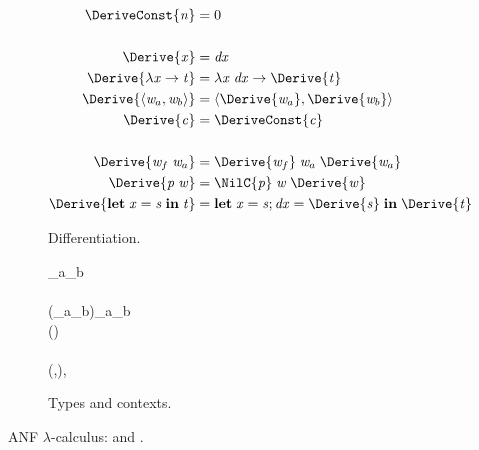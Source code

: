 \begin{figure}[h]
\begin{subfigure}[t]{0.5\textwidth}
\begin{align*}
  \ensuremath{\DeriveConst{\Varid{n}}} &= \ensuremath{\mathrm{0}}\\
  \\
  \ensuremath{\Derive{\Varid{x}}} &= \ensuremath{\Varid{dx}} \\
  \ensuremath{\Derive{\lambda \Varid{x}\to \Varid{t}}} &= \ensuremath{\lambda \Varid{x}\;\Varid{dx}\to \Derive{\Varid{t}}} \\
  \ensuremath{\Derive{\langle\Varid{w}_a,\Varid{w}_b\rangle}} &= \ensuremath{\langle\Derive{\Varid{w}_a},\Derive{\Varid{w}_b}\rangle}\\
  \ensuremath{\Derive{\Varid{c}}} &= \ensuremath{\DeriveConst{\Varid{c}}}\\
  \\
  \ensuremath{\Derive{\Varid{w}_f\;\Varid{w}_a}} &= \ensuremath{\Derive{\Varid{w}_f}\;\Varid{w}_a\;\Derive{\Varid{w}_a}} \\
  \ensuremath{\Derive{\Varid{p}\;\Varid{w}}} &= \ensuremath{\NilC{\Varid{p}}\;\Varid{w}\;\Derive{\Varid{w}}} \\
  \ensuremath{\Derive{\mathbf{let}\;\Varid{x}\mathrel{=}\Varid{s}\;\mathbf{in}\;\Varid{t}}} &= \ensuremath{\mathbf{let}\;\Varid{x}\mathrel{=}\Varid{s};\Varid{dx}\mathrel{=}\Derive{\Varid{s}}\;\mathbf{in}\;\Derive{\Varid{t}}}
\end{align*}
\caption{Differentiation.}
\label{sfig:anf-derive}
\end{subfigure}
%
\hfill
%
\begin{subfigure}[t]{0.49\textwidth}
\begin{hscode}\SaveRestoreHook
{}%
%
%
%
\>[3]{}\tau\mathbin{::=}\mid \tau_a\times\tau_b\mid \sigma\to \tau{}\<[E]%
\\[\blanklineskip]%
\>[3]{}\Delta {}\<[27]%
\>[27]{}\mathrel{=}\<[E]%
\\
\>[3]{}\Delta (\tau_a\times\tau_b){}\<[27]%
\>[27]{}\mathrel{=}\Delta \tau_a\times\Delta \tau_b{}\<[E]%
\\
\>[3]{}\Delta (\sigma\to \tau){}\<[27]%
\>[27]{}\mathrel{=}\sigma\to \Delta \sigma\to \Delta \tau{}\<[E]%
\\[\blanklineskip]%
\>[3]{}\Delta \EmptyContext{}\<[27]%
\>[27]{}\mathrel{=}\EmptyContext{}\<[E]%
\\
\>[3]{}\Delta (\Gamma,\typcolon\tau){}\<[27]%
\>[27]{}\mathrel{=}\Delta \Gamma,\typcolon\Delta \tau{}\<[E]%
\ColumnHook
\end{hscode}\resethooks
\caption{Types and contexts.}
\label{sfig:anf-types}
\end{subfigure}

\caption{ANF $\lambda$-calculus: \ilcUntau{} and \dilcUntau{}.}
\label{fig:anf-lambda-calculus}
\end{figure}

